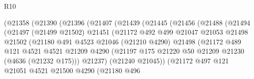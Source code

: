 \begin{lexlean}{R10}
\begin{coremodule}
                        (@21358
                          (@21390
                            (@21396
                              (@21407
                                (@21439
                                  (@21445
                                    (@21456
                                      (@21488
                                        (@21494
                                          (@21497
                                            (@21499 @21502)
                                            @21451
                                            (@21172
                                              @492
                                              @499
                                              @21047
                                              @21053
                                              @21498
                                              @21502
                                              (@21180
                                                @491
                                                @4523
                                                @21046
                                                (@21210 @4290)
                                                @21498
                                                (@21172
                                                  @489
                                                  @121
                                                  @4521
                                                  @4521
                                                  @21209
                                                  @4290
                                                  (@21197
                                                    @175
                                                    @21220
                                                    @50
                                                    @21209
                                                    @21230
                                                    (@4636 (@21232 @175)))
                                                  @21237)
                                                (@21240 @21045))
                                              (@21172
                                                @497
                                                @121
                                                @21051
                                                @4521
                                                @21500
                                                @4290
                                                (@21180
                                                  @496

\end{coremodule}
\end{lexlean}

